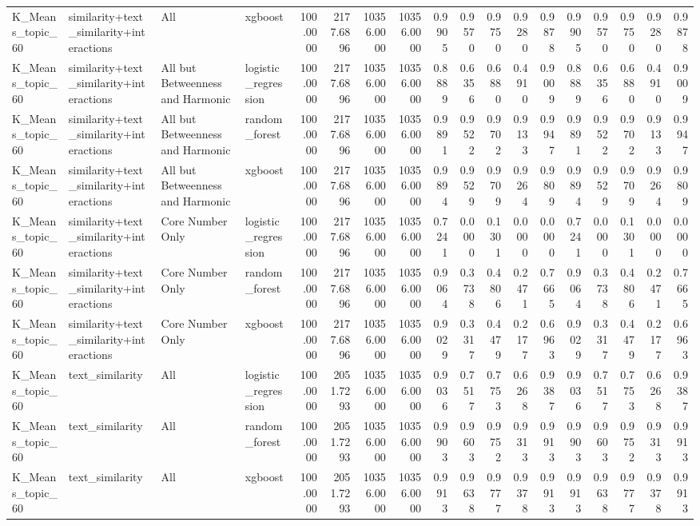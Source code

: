 \begin{tabular}{llllrrrrrrrrrrrrrr}
K_Means_topic_60 & similarity+text_similarity+interactions & All & xgboost & 100.0000 & 2177.6896 & 10356.0000 & 10356.0000 & 0.9905 & 0.9570 & 0.9750 & 0.9280 & 0.9878 & 0.9905 & 0.9570 & 0.9750 & 0.9280 & 0.9878 \\
K_Means_topic_60 & similarity+text_similarity+interactions & All but Betweenness and Harmonic & logistic_regression & 100.0000 & 2177.6896 & 10356.0000 & 10356.0000 & 0.8889 & 0.6356 & 0.6880 & 0.4910 & 0.9009 & 0.8889 & 0.6356 & 0.6880 & 0.4910 & 0.9009 \\
K_Means_topic_60 & similarity+text_similarity+interactions & All but Betweenness and Harmonic & random_forest & 100.0000 & 2177.6896 & 10356.0000 & 10356.0000 & 0.9891 & 0.9522 & 0.9702 & 0.9133 & 0.9947 & 0.9891 & 0.9522 & 0.9702 & 0.9133 & 0.9947 \\
K_Means_topic_60 & similarity+text_similarity+interactions & All but Betweenness and Harmonic & xgboost & 100.0000 & 2177.6896 & 10356.0000 & 10356.0000 & 0.9894 & 0.9529 & 0.9709 & 0.9264 & 0.9809 & 0.9894 & 0.9529 & 0.9709 & 0.9264 & 0.9809 \\
K_Means_topic_60 & similarity+text_similarity+interactions & Core Number Only & logistic_regression & 100.0000 & 2177.6896 & 10356.0000 & 10356.0000 & 0.7241 & 0.0000 & 0.1301 & 0.0000 & 0.0000 & 0.7241 & 0.0000 & 0.1301 & 0.0000 & 0.0000 \\
K_Means_topic_60 & similarity+text_similarity+interactions & Core Number Only & random_forest & 100.0000 & 2177.6896 & 10356.0000 & 10356.0000 & 0.9064 & 0.3738 & 0.4806 & 0.2471 & 0.7665 & 0.9064 & 0.3738 & 0.4806 & 0.2471 & 0.7665 \\
K_Means_topic_60 & similarity+text_similarity+interactions & Core Number Only & xgboost & 100.0000 & 2177.6896 & 10356.0000 & 10356.0000 & 0.9029 & 0.3317 & 0.4479 & 0.2177 & 0.6963 & 0.9029 & 0.3317 & 0.4479 & 0.2177 & 0.6963 \\
K_Means_topic_60 & text_similarity & All & logistic_regression & 100.0000 & 2051.7293 & 10356.0000 & 10356.0000 & 0.9036 & 0.7517 & 0.7753 & 0.6268 & 0.9387 & 0.9036 & 0.7517 & 0.7753 & 0.6268 & 0.9387 \\
K_Means_topic_60 & text_similarity & All & random_forest & 100.0000 & 2051.7293 & 10356.0000 & 10356.0000 & 0.9903 & 0.9603 & 0.9752 & 0.9313 & 0.9913 & 0.9903 & 0.9603 & 0.9752 & 0.9313 & 0.9913 \\
K_Means_topic_60 & text_similarity & All & xgboost & 100.0000 & 2051.7293 & 10356.0000 & 10356.0000 & 0.9913 & 0.9638 & 0.9777 & 0.9378 & 0.9913 & 0.9913 & 0.9638 & 0.9777 & 0.9378 & 0.9913 \\

\end{tabular}
